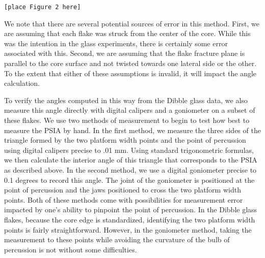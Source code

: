 \documentclass[10pt,letterpaper]{article}
\begin{document}
\begin{verbatim}
[place Figure 2 here]
\end{verbatim}

We note that there are several potential sources of error in this
method. First, we are assuming that each flake was struck from the
center of the core. While this was the intention in the glass
experiments, there is certainly some error associated with this. Second,
we are assuming that the flake fracture plane is parallel to the core
surface and not twisted towards one lateral side or the other. To the
extent that either of these assumptions is invalid, it will impact the
angle calculation.

To verify the angles computed in this way from the Dibble glass data, we
also measure this angle directly with digital calipers and a goniometer
on a subset of these flakes. We use two methods of measurement to begin
to test how best to measure the PSIA by hand. In the first method, we
measure the three sides of the triangle formed by the two platform width
points and the point of percussion using digital calipers precise to .01
mm. Using standard trigonometric formulas, we then calculate the
interior angle of this triangle that corresponds to the PSIA as
described above. In the second method, we use a digital goniometer
precise to 0.1 degrees to record this angle. The joint of the goniometer
is positioned at the point of percussion and the jaws positioned to
cross the two platform width points. Both of these methods come with
possibilities for measurement error impacted by one's ability to
pinpoint the point of percussion. In the Dibble glass flakes, because
the core edge is standardized, identifying the two platform width points
is fairly straightforward. However, in the goniometer method, taking the
measurement to these points while avoiding the curvature of the bulb of
percussion is not without some difficulties.
\end{document}
